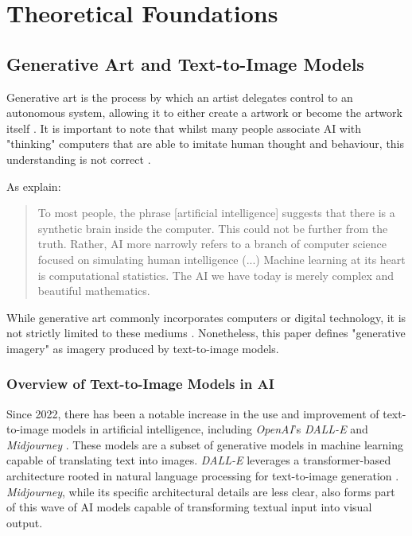 \section{Theoretical Foundations}
\label{section:theoretical-foundations}

\subsection{Generative Art and Text-to-Image Models}
\label{subsec:generative-art}

Generative art is the process by which an artist delegates control to an autonomous system, allowing it to either create a artwork or become the artwork itself \parencite[112]{Galanter2019}. It is important to note that whilst many people associate AI with "thinking" computers that are able to imitate human thought and behaviour, this understanding is not correct \parencite{Thomas2023}.

As \textcite[673 - 677]{Broussard2019} explain:
\begin{quote}
To most people, the phrase [artificial intelligence] suggests that there is a synthetic brain inside the computer. This could not be further from the truth. Rather, AI more narrowly refers to a branch of computer science focused on simulating human intelligence (...) Machine learning at its heart is computational statistics. The AI we have today is merely complex and beautiful mathematics.
\end{quote}
While generative art commonly incorporates computers or digital technology, it is not strictly limited to these mediums \parencite[5]{Thomas2023}. Nonetheless, this paper defines "generative imagery" as imagery produced by text-to-image models. 

\subsubsection{Overview of Text-to-Image Models in AI}

Since 2022, there has been a notable increase in the use and improvement of text-to-image models in artificial intelligence, including \textit{OpenAI}'s \textit{DALL-E} and \textit{Midjourney}  \parencite{Gozalo2023}. These models are a subset of generative models in machine learning \parencite{Bie2023} capable of translating text into images. \textit{DALL-E} leverages a transformer-based architecture rooted in natural language processing for text-to-image generation \parencite{DataCamp2023}. \textit{Midjourney}, while its specific architectural details are less clear, also forms part of this wave of AI models capable of transforming textual input into visual output.

